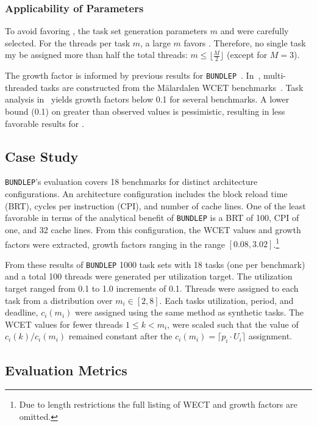 \documentclass[a4paper,UKenglish,cleveref,autoref,english]{lipics-v2019}
\newcommand{\bundlep}{\texttt{BUNDLEP}}
\begin{document}
\subsubsection{Applicability of Parameters}

To avoid favoring \tpj{}, the task set generation parameters ${m}$ and
\GFactor{} were carefully selected. For the threads per task ${m}$, a
large ${m}$ favors \tpj{}. Therefore, no single task my be
assigned more than half the total threads: ${m \le \lfloor \frac{M}{2}
\rfloor}$ (except for ${M = 3}$). 

The growth factor \GFactor{} is informed by previous results for
\bundlep{}~\cite{Tessler:2018b}. In~\cite{Tessler:2018b},
multi-threaded tasks are constructed from the M{\"a}lardalen WCET
benchmarks~\cite{Gustafsson:2010}. Task analysis
in~\cite{Tessler:2018b} yields growth factors below 0.1 for several
benchmarks. A lower bound (0.1) on \GFactor{} greater than observed
values is pessimistic, resulting in less favorable results for \tpj{}.

\subsection{Case Study}

\bundlep{}'s evaluation covers 18 benchmarks for distinct architecture
configurations. An architecture configuration includes the block
reload time (BRT), cycles per instruction (CPI), and number of cache
lines. One of the least favorable in terms of the analytical
benefit of \bundlep{} is a BRT of 100, CPI of one, and 32 cache
lines. From this configuration, the WCET values and growth factors
were extracted, growth factors ranging in the range
${[0.08,3.02]}$.\footnote{Due to length restrictions the full listing
  of WECT and growth factors are omitted.}

From these results of \bundlep{} 1000 task sets with 18 tasks (one per
benchmark) and a total 100 threads were generated per utilization
target. The utilization target ranged from 0.1 to 1.0 increments of
0.1. Threads were assigned to each task  from a distribution
over ${m_i \in [2,8]}$. Each tasks utilization, period, and deadline,
${c_i(m_i)}$ were assigned using the same method as synthetic tasks.
The WCET values for fewer threads ${1 \le k < m_i}$, were scaled such
that the value of ${c_i(k) / c_i(m_i)}$ remained constant after the
${c_i(m_i) = \lceil p_i \cdot U_i \rceil}$ assignment.


\subsection{Evaluation Metrics}
\end{document}
